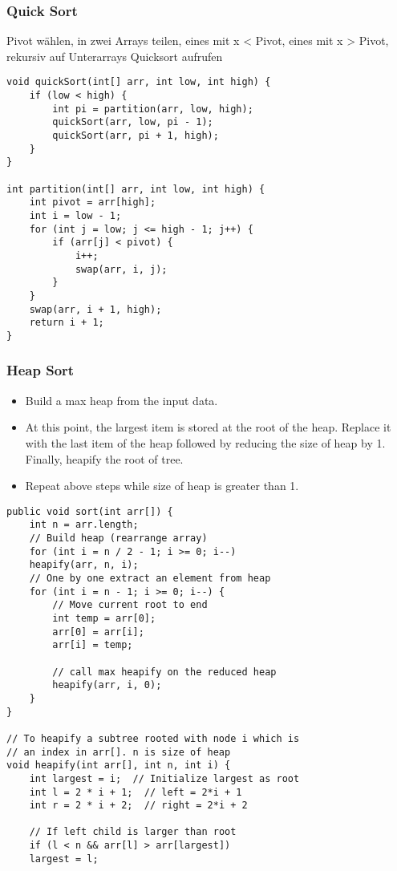 \begin{multicols*}{4}
		\subsubsection{Quick Sort}
		Pivot wählen, in zwei Arrays teilen, eines mit x < Pivot, eines mit x > Pivot, rekursiv auf Unterarrays Quicksort aufrufen
			\begin{lstlisting}
void quickSort(int[] arr, int low, int high) {
	if (low < high) {
		int pi = partition(arr, low, high);
		quickSort(arr, low, pi - 1);
		quickSort(arr, pi + 1, high);
	}
}
	
int partition(int[] arr, int low, int high) {
	int pivot = arr[high];
	int i = low - 1;
	for (int j = low; j <= high - 1; j++) {
		if (arr[j] < pivot) {
			i++;
			swap(arr, i, j);
		}
	}
	swap(arr, i + 1, high);
	return i + 1;
}
			\end{lstlisting}

		\subsubsection{Heap Sort}
			\begin{itemize}
				\item Build a max heap from the input data.
				\item At this point, the largest item is stored at the root of the heap. Replace it with the last item of the heap followed by reducing the size of heap by 1. Finally, heapify the root of tree.
				\item Repeat above steps while size of heap is greater than 1.			
			\end{itemize}
			\begin{lstlisting}
public void sort(int arr[]) { 
	int n = arr.length; 
	// Build heap (rearrange array) 
	for (int i = n / 2 - 1; i >= 0; i--) 
	heapify(arr, n, i); 
	// One by one extract an element from heap 
	for (int i = n - 1; i >= 0; i--) { 
		// Move current root to end 
		int temp = arr[0]; 
		arr[0] = arr[i]; 
		arr[i] = temp; 
		
		// call max heapify on the reduced heap 
		heapify(arr, i, 0); 
	} 
} 

// To heapify a subtree rooted with node i which is 
// an index in arr[]. n is size of heap 
void heapify(int arr[], int n, int i) { 
	int largest = i;  // Initialize largest as root 
	int l = 2 * i + 1;  // left = 2*i + 1 
	int r = 2 * i + 2;  // right = 2*i + 2 
	
	// If left child is larger than root 
	if (l < n && arr[l] > arr[largest]) 
	largest = l; 
	

\end{lstlisting}
\end{multicols*}
